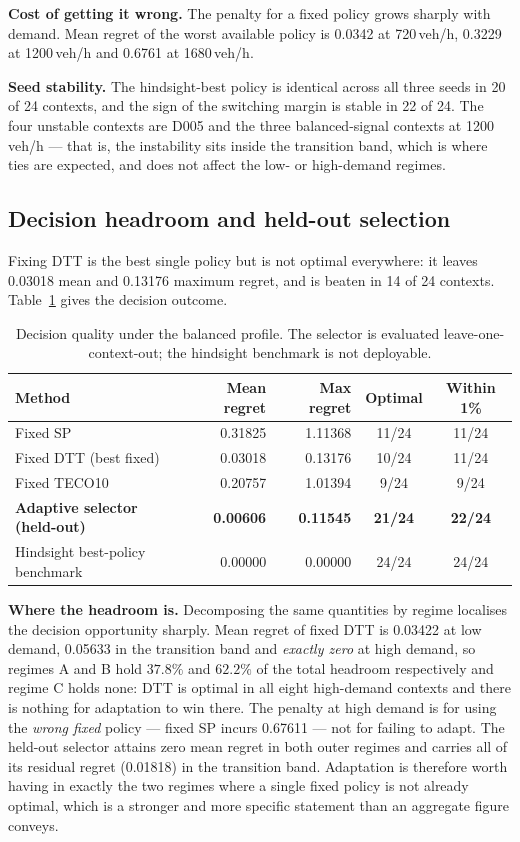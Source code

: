 \documentclass[10pt,a4paper]{article}
\begin{document}
\textbf{Cost of getting it wrong.} The penalty for a fixed policy grows sharply with demand. Mean regret of the worst available policy is 0.0342 at 720\,veh/h, 0.3229 at 1200\,veh/h and 0.6761 at 1680\,veh/h.

\textbf{Seed stability.} The hindsight-best policy is identical across all three seeds in 20 of 24 contexts, and the sign of the switching margin is stable in 22 of 24. The four unstable contexts are D005 and the three balanced-signal contexts at 1200\,veh/h --- that is, the instability sits inside the transition band, which is where ties are expected, and does not affect the low- or high-demand regimes.

\subsection{Decision headroom and held-out selection}
Fixing DTT is the best single policy but is not optimal everywhere: it leaves 0.03018 mean and 0.13176 maximum regret, and is beaten in 14 of 24 contexts. Table~\ref{tab:decision} gives the decision outcome.

\begin{table}[htbp]\centering\small
\caption{Decision quality under the balanced profile. The selector is evaluated leave-one-context-out; the hindsight benchmark is not deployable.}\label{tab:decision}
\begin{tabular}{lrrcc}\toprule
Method & Mean regret & Max regret & Optimal & Within 1\% \\\midrule
Fixed SP & 0.31825 & 1.11368 & 11/24 & 11/24 \\
Fixed DTT (best fixed) & 0.03018 & 0.13176 & 10/24 & 11/24 \\
Fixed TECO10 & 0.20757 & 1.01394 & 9/24 & 9/24 \\
\textbf{Adaptive selector (held-out)} & \textbf{0.00606} & \textbf{0.11545} & \textbf{21/24} & \textbf{22/24} \\
Hindsight best-policy benchmark & 0.00000 & 0.00000 & 24/24 & 24/24 \\
\bottomrule\end{tabular}\end{table}

\textbf{Where the headroom is.} Decomposing the same quantities by regime localises the decision opportunity sharply. Mean regret of fixed DTT is 0.03422 at low demand, 0.05633 in the transition band and \emph{exactly zero} at high demand, so regimes A and B hold $37.8\%$ and $62.2\%$ of the total headroom respectively and regime C holds none: DTT is optimal in all eight high-demand contexts and there is nothing for adaptation to win there. The penalty at high demand is for using the \emph{wrong fixed} policy --- fixed SP incurs 0.67611 --- not for failing to adapt. The held-out selector attains zero mean regret in both outer regimes and carries all of its residual regret (0.01818) in the transition band. Adaptation is therefore worth having in exactly the two regimes where a single fixed policy is not already optimal, which is a stronger and more specific statement than an aggregate figure conveys.
\end{document}
